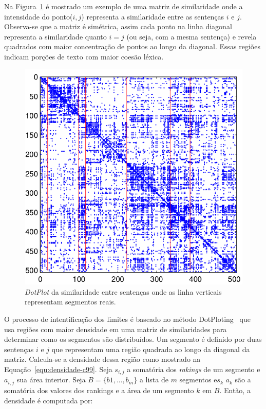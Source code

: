 \documentclass[10pt,a4paper]{article}
\begin{document}
Na Figura~\ref{fig:matrix-similarity} é mostrado um exemplo de uma matriz de similaridade onde a intensidade do ponto($i,j$) representa a similaridade entre as sentenças $i$ e $j$. Observa-se que a matriz é simétrica, assim cada ponto na linha diagonal representa a similaridade quanto $i = j$ (ou seja, com a mesma sentença) e revela quadrados com maior concentração de pontos ao longo da diagonal. Essas regiões indicam porções de texto com maior coesão léxica.


  \begin{figure}[!h]
	  \centering
	  \includegraphics[width=1\textwidth]{c99-ranking-matrix.png}
	  \caption{\textit{DotPlot} da similaridade entre sentenças onde as linha verticais representam segmentos reais.}
	  \label{fig:matrix-similarity}
  \end{figure}







O processo de intentificação dos limites é baseado no método DotPloting~\cite{Reynar} que usa regiões com maior densidade em uma matriz de similaridades para determinar como os segmentos são distribuídos. Um segmento é definido por duas sentenças $i$ e $j$ que representam uma região quadrada ao longo da diagonal da matriz. Calcula-se a densidade dessa região como mostrado na Equação~\ref{equ:densidade-c99}.
%
%
%
%
Seja $s_{i,j}$ a somatória dos \textit{rakings} de um segmento e $a_{i,j}$ sua área interior. 
Seja $B = \{b1,...,b_m\}$ a lista de $m$ segmentos e$s_k$  $a_k$ são a somatória dos valores dos rankings e a área de um segmento $k$ em $B$. Então, a densidade é computada por: 
\end{document}

